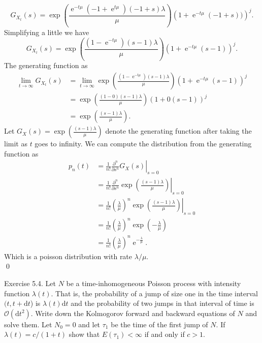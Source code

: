 \documentclass[10pt]{amsart}
\newcommand{\D}{\mathrm{d}}
\DeclareMathOperator{\E}{e}
\begin{document}
$$
G_{X_t}(s) = \exp\left( \frac {\E^{-t \mu} (-1 + \E^{t \mu}) (-1 + s) \lambda } {\mu}  \right) \left( 1 + \E^{-t \mu} (-1 + s)) \right)^j.
$$
Simplifying a little we have
$$
G_{X_t}(s) = \exp\left( \frac {(1 - \E^{-t \mu}) (s - 1) \lambda } {\mu}  \right) \left( 1 + \E^{-t \mu} (s - 1) \right)^j.
$$
The generating function as 
\begin{align*}
\lim_{t \rightarrow \infty} G_{X_t}(s)
	&= \lim_{t \rightarrow \infty} \exp \left( \frac {(1 - \E^{-t \mu}) (s - 1) \lambda } {\mu}  \right) \left( 1 + \E^{-t \mu} (s - 1) \right)^j \\
	&= \exp\left( \frac {(1 - 0) (s - 1) \lambda } {\mu}  \right) \left( 1 + 0 (s - 1) \right)^j \\
	&= \exp\left( \frac {(s - 1) \lambda } {\mu}  \right).
\end{align*}
Let $G_X(s) = \exp\left( \frac {(s - 1) \lambda } {\mu}  \right)$ denote the generating function after taking the limit as $t$ goes to infinity.
We can compute the distribution from the generating function as
\begin{align*}
p_n(t) &= \left. \frac 1 {n!} \frac {\partial^n} {\partial s^n}G_X(s) \right|_{s=0}\\
	&= \left. \frac 1 {n!} \frac {\partial^n} {\partial s^n} \exp\left( \frac {(s - 1) \lambda } {\mu}  \right) \right|_{s=0} \\
	&= \left. \frac 1 {n!} \left( \frac \lambda \mu \right)^n \exp\left( \frac {(s - 1) \lambda } {\mu}  \right) \right|_{s=0} \\
	&= \frac 1 {n!} \left( \frac \lambda \mu \right)^n \exp\left( - \frac \lambda \mu \right) \\
	&= \frac 1 {n!} \left( \frac \lambda \mu \right)^n \E^{- \frac \lambda \mu}.
\end{align*}
Which is a poisson distribution with rate $\lambda / \mu$. \\
\qed \\

\newpage

 Exercise 5.4.
Let $N$ be a time-inhomogeneous Poisson process with intensity function $\lambda(t)$.
That is, the probability of a jump of size one in the time interval $(t, t + \D t$) is $\lambda(t) \D t$ and the probability of two jumps in that interval of time is $\mathcal O(\D t^2)$.
Write down the Kolmogorov forward and backward equations of $N$ and solve them.
Let $N_0 = 0$ and let $\tau_1$ be the time of the first jump of $N$.
If $\lambda(t) = c/(1 + t)$ show that $E(\tau_1) < \infty$ if and only if $c > 1$. \\
\end{document}
